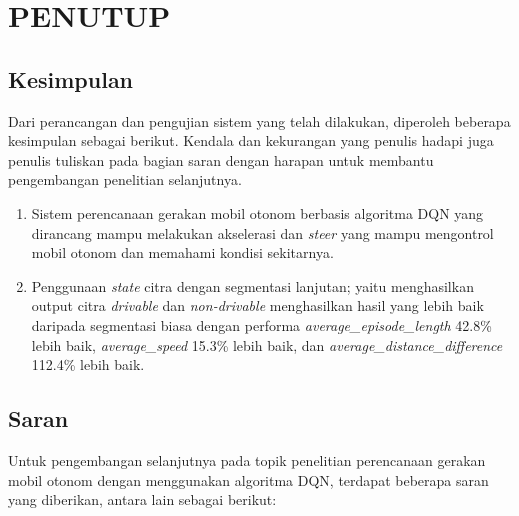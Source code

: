 \chapter{PENUTUP}
\label{chap:penutup}


\section{Kesimpulan}
\label{sec:kesimpulan}

Dari perancangan dan pengujian sistem yang telah dilakukan, diperoleh beberapa kesimpulan sebagai berikut. Kendala dan kekurangan yang penulis hadapi juga penulis tuliskan pada bagian saran dengan harapan untuk membantu pengembangan penelitian selanjutnya.

\begin{enumerate}[nolistsep]

  \item Sistem perencanaan gerakan mobil otonom berbasis algoritma DQN yang dirancang mampu melakukan akselerasi dan \textit{steer} yang mampu mengontrol mobil otonom dan memahami kondisi sekitarnya.

  \item Penggunaan \textit{state } citra dengan segmentasi lanjutan; yaitu menghasilkan output citra \textit{drivable }dan \textit{non-drivable} menghasilkan hasil yang lebih baik daripada segmentasi biasa dengan performa \textit{average\_episode\_length} 42.8\% lebih baik, \textit{average\_speed} 15.3\% lebih baik, dan \textit{average\_distance\_difference} 112.4\% lebih baik.

\end{enumerate}

\section{Saran}
\label{chap:saran}

Untuk pengembangan selanjutnya pada topik penelitian perencanaan gerakan mobil otonom dengan menggunakan algoritma DQN, terdapat beberapa saran yang diberikan, antara lain sebagai berikut:

